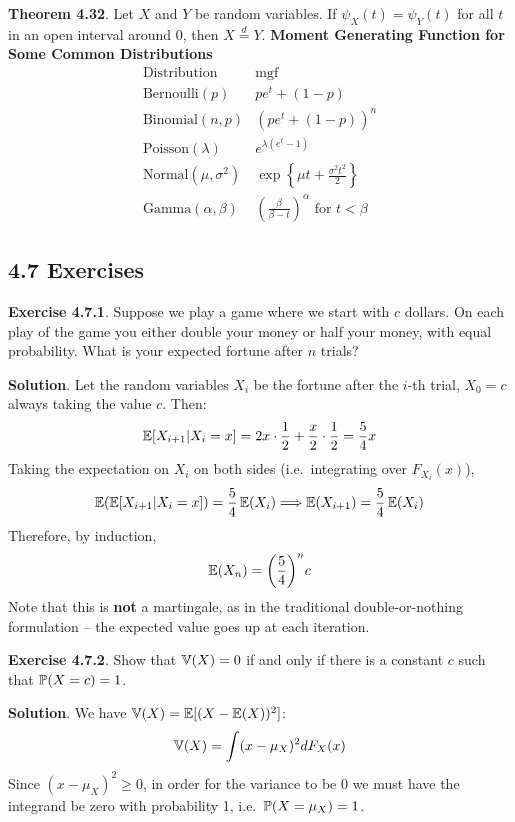 \textbf{Theorem 4.32}. Let \(X\) and \(Y\) be random variables. If
\(\psi_X(t) = \psi_Y(t)\) for all \(t\) in an open interval around 0,
then \(X \overset{d}= Y\).
\textbf{Moment Generating Function for Some Common Distributions}
\[
\begin{array}{ll}
\text{Distribution} & \text{mgf} \\
\hline
\text{Bernoulli}(p)   & pe^t + (1 - p)         \\
\text{Binomial}(n, p) & (pe^t + (1 - p))^{n}     \\
\text{Poisson}(\lambda) & e^{\lambda(e^t - 1)} \\
\text{Normal}(\mu, \sigma^{2}) & \exp\left\{\mu t + \frac{\sigma^{2} t^{2}}{2} \right\} \\
\text{Gamma}(\alpha, \beta) & \left( \frac{\beta}{\beta - t} \right)^\alpha \text{ for } t < \beta
\end{array}
\]

\subsection*{4.7 Exercises}

\textbf{Exercise 4.7.1}. Suppose we play a game where we start with
\(c\) dollars. On each play of the game you either double your money or
half your money, with equal probability. What is your expected fortune
after \(n\) trials?

\textbf{Solution}. Let the random variables \(X_{i}\) be the fortune after
the \(i\)-th trial, \(X_{0} = c\) always taking the value \(c\). Then:
\[
\operatorname{\mathbb{E}}[X_{i + 1} | X_{i} = x] = 2x \cdot \frac{1}{2} + \frac{x}{2} \cdot \frac{1}{2} = \frac{5}{4}x
\]
Taking the expectation on \(X_{i}\) on both sides (i.e.~integrating over
\(F_{X_{i}}(x)\)),
\[
\operatorname{\mathbb{E}}(\operatorname{\mathbb{E}}[X_{i + 1} | X_{i} = x]) = \frac{5}{4} \operatorname{\mathbb{E}}(X_{i}) \Longrightarrow \operatorname{\mathbb{E}}(X_{i+1}) = \frac{5}{4}  \operatorname{\mathbb{E}}(X_{i})
\]
Therefore, by induction,
\[
\EXP(X_{n}) = \left(\frac{5}{4}\right)^{n} c
\]
Note that this is \textbf{not} a martingale, as in the traditional
double-or-nothing formulation -- the expected value goes up at each
iteration.

\textbf{Exercise 4.7.2}. Show that \(\operatorname{\mathbb{V}}(X) = 0\) if and only if
there is a constant \(c\) such that \(\operatorname{\mathbb{P}}(X = c) = 1\).

\textbf{Solution}. We have
\(\operatorname{\mathbb{V}}(X) = \operatorname{\mathbb{E}}[(X - \operatorname{\mathbb{E}}(X))^{2}]\):
\[
\operatorname{\mathbb{V}}(X) = \int (x - \mu_X)^{2} dF_X(x)
\]
Since \((x - \mu_X)^{2} \geq 0\), in order for the variance to be 0 we
must have the integrand be zero with probability 1,
i.e.~\(\operatorname{\mathbb{P}}(X = \mu_X) = 1\).

